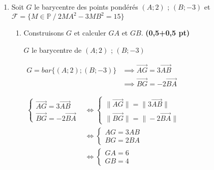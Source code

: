 \documentclass[12pt,a4paper]{article}
\begin{document}
\begin{enumerate}
\begin{enumerate}
\begin{center}
                    \end{center}

          \end{enumerate}

    \item Soit \( G \) le barycentre des points pondérés \( (A ; 2) \) ; \( (B ; -3) \)
          et \( \mathcal{F} = \{ M \in \mathbb{P} \ / \ 2MA^2 - 3MB^2 = 15 \} \)
          \begin{enumerate}
              \item Construisons \( G \) et calculer \( GA \) et \( GB \). \hfill \textbf{(0,5+0,5
                        pt)}

                    \( G \) le barycentre de \( (A ; 2) \) ; \( (B ; -3) \)

                    \(
                    \begin{aligned}
                        G =bar\{ (A ; 2) ; (B ; -3) \} & \implies \overrightarrow{AG} = 3 \overrightarrow{AB}  \\
                                                       & \implies \overrightarrow{BG} = -2 \overrightarrow{BA}
                    \end{aligned}
                    \)

                    \(
                    \begin{aligned}
                        \begin{cases}
                            \overrightarrow{AG} = 3 \overrightarrow{AB} \\
                            \overrightarrow{BG} = -2 \overrightarrow{BA}
                        \end{cases} & \iff
                        \begin{cases}
                            \| \overrightarrow{AG} \| =\| 3 \overrightarrow{AB}\| \\
                            \| \overrightarrow{BG} \|=\| -2 \overrightarrow{BA}\|
                        \end{cases} \\     & \iff
                        \begin{cases}
                            AG = 3 AB \\
                            BG = 2 BA
                        \end{cases}                                          \\     & \iff
                              \begin{cases}
                            GA = 6 \\
                            GB = 4
                        \end{cases}
                    \end{aligned}
                    \)


\end{enumerate}
\end{enumerate}
\end{document}
